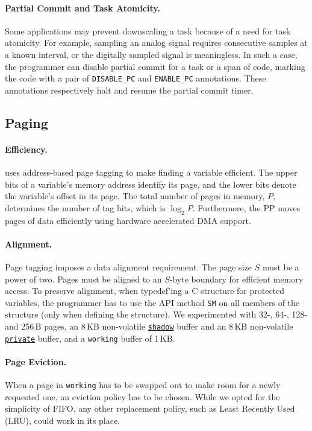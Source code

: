  \paragraph{Partial Commit and Task Atomicity.}
 Some applications may prevent
downscaling a task because of a need for task atomicity.  For example, sampling
an analog signal requires consecutive samples at a known interval, or the
digitally sampled signal is meaningless.  In such a case, the programmer can
disable partial commit for a task or a span of code, marking  the code with a
pair of \texttt{DISABLE\_PC} and \texttt{ENABLE\_PC} annotations.
These annotations respectively halt and resume the partial commit timer.

\subsection{Paging}
\label{sec:impl:paging}


\paragraph{Efficiency.}
\sys uses address-based page tagging to make finding a variable efficient.  The
upper bits of a variable's memory address identify its page, and the lower bits
denote the variable's offset in its page. The total number of pages in memory,
$P$, determines the number of tag bits, which is $\log_2 P$.
%
Furthermore, the PP moves pages of data efficiently using hardware accelerated DMA support.

\paragraph{Alignment.}
Page tagging imposes a data alignment requirement.
The page size $S$ must be a power of two. 
%
Pages must be aligned to an $S$-byte boundary for efficient memory access. 
%
To preserve alignment, when typedef'ing a C structure for protected variables, the programmer has to use the API method \texttt{SM} on all members of the structure (only when defining the structure).
%
We experimented with 32-, 64-, 128- and 256\,B pages, an 8\,KB non-volatile \texttt{\underline{shadow}} buffer and
an 8\,KB non-volatile \texttt{\underline{private}} buffer, and a \texttt{working} buffer
of 1\,KB.

\paragraph{Page Eviction.}
When a page in \texttt{working} has to be swapped out to make room for a newly requested one, an eviction policy has to be chosen.
While we opted for the simplicity of FIFO, any other replacement policy, such as Least Recently Used (LRU), could work in its place.

